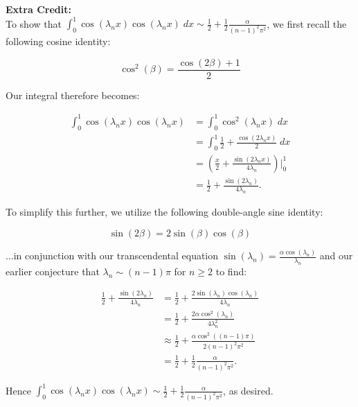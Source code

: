 \begin{solution}
    \pagebreak
    \textbf{Extra Credit:}\ \\

    To show that $\int_{0}^{1}{\cos{(\lambda_n x)} \cos{(\lambda_n x)}\; dx} \sim \frac{1}{2} + \frac{1}{2} \frac{\alpha}{(n - 1)^2 \pi^2}$,
    we first recall the following cosine identity:

    $$
        \cos^{2}{(\beta)} = \frac{\cos{(2 \beta)} + 1}{2}
    $$

    Our integral therefore becomes:

    \begin{align*}
        \int_{0}^{1}{\cos{(\lambda_n x)} \cos{(\lambda_n x)}} &= \int_{0}^{1}{\cos^2{(\lambda_n x)}\; dx} \\
                                                              &= \int_{0}^{1}{\frac{1}{2} + \frac{\cos{(2 \lambda_n x)}}{2}\; dx} \\
                                                              &= \left( \frac{x}{2} + \frac{\sin{(2 \lambda_n x)}}{4 \lambda_n} \right) \bigg\vert_{0}^{1} \\
                                                              &= \frac{1}{2} + \frac{\sin{(2 \lambda_n)}}{4 \lambda_n}.
    \end{align*}

    To simplify this further, we utilize the following double-angle sine identity:

    $$
        \sin{(2 \beta)} = 2 \sin{(\beta)} \cos{(\beta)}
    $$

    ...in conjunction with our transcendental equation $\sin{(\lambda_n) = \frac{\alpha \cos{(\lambda_n)}}{\lambda_n}}$ and our
    earlier conjecture that $\lambda_n \sim (n - 1) \pi$ for $n \ge 2$ to find:

    \begin{align*}
        \frac{1}{2} + \frac{\sin{(2 \lambda_n)}}{4 \lambda_n} &= \frac{1}{2} + \frac{2 \sin{(\lambda_n)} \cos{(\lambda_n)}}{4 \lambda_n} \\
                                                              &= \frac{1}{2} + \frac{2 \alpha \cos^2{(\lambda_n)}}{4 \lambda_n^2} \\
                                                              &\approx \frac{1}{2} + \frac{\alpha \cos^2{\left((n-1) \pi\right)}}{2 (n-1)^2 \pi^2} \\
                                                              &= \frac{1}{2} + \frac{1}{2} \frac{\alpha}{(n-1)^2 \pi^2}.
    \end{align*}

    Hence $\int_{0}^{1}{\cos{(\lambda_n x)} \cos{(\lambda_n x)}} \sim \frac{1}{2} + \frac{1}{2} \frac{\alpha}{(n-1)^2 \pi^2}$, as desired.

\end{solution}